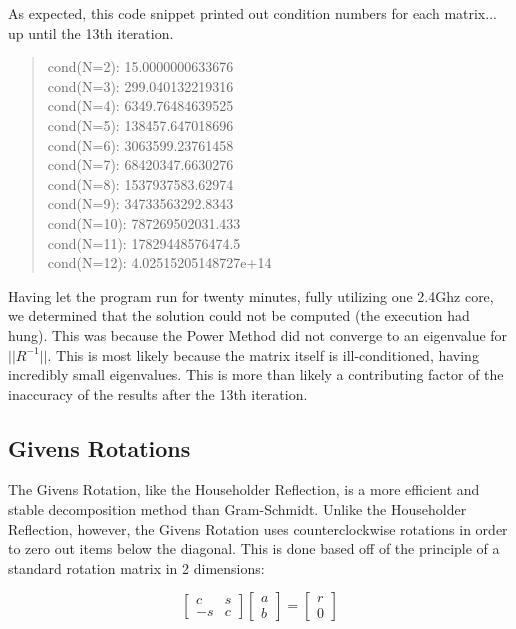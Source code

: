 \documentclass[letterpaper,12pt]{article}
\begin{document}
As expected, this code snippet printed out condition numbers for each matrix...
up until the 13th iteration.

\begin{quote}
cond(N=2):  15.0000000633676\\
cond(N=3):  299.040132219316\\
cond(N=4):  6349.76484639525\\
cond(N=5):  138457.647018696\\
cond(N=6):  3063599.23761458\\
cond(N=7):  68420347.6630276\\
cond(N=8):  1537937583.62974\\
cond(N=9):  34733563292.8343\\
cond(N=10): 787269502031.433\\
cond(N=11): 17829448576474.5\\
cond(N=12): 4.02515205148727e+14
\end{quote}

Having let the program run for twenty minutes, fully utilizing one 2.4Ghz core,
we determined that the solution could not be computed (the execution had hung).
This was because the Power Method did not converge to an eigenvalue for
$||R^{-1}||$.
This is most likely because the matrix itself is ill-conditioned, having incredibly
small eigenvalues.
This is more than likely a contributing factor of the inaccuracy of the results
after the 13th iteration.

\subsection{Givens Rotations}

The Givens Rotation, like the Householder Reflection, is a more efficient and
stable decomposition method than Gram-Schmidt.
Unlike the Householder Reflection, however, the Givens Rotation uses counterclockwise
rotations in order to zero out items below the diagonal.
This is done based off of the principle of a standard rotation matrix in 2 dimensions:

\[\left[ \begin{array}{cc} c & s \\ -s & c \end{array} \right]
\left[ \begin{array}{c} a \\ b \end{array} \right] =
\left[ \begin{array}{c} r \\ 0 \end{array} \right] \]
\end{document}
